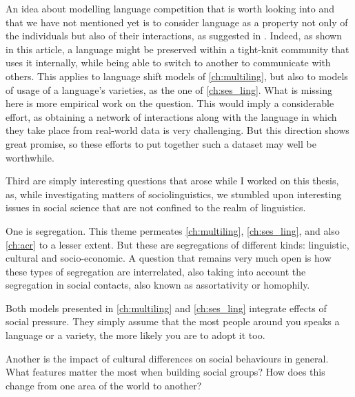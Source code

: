 \documentclass[../thesis.tex]{subfiles}
\begin{document}
An idea about modelling language competition that is worth looking into and that we have
not mentioned yet is to consider language as a property not only of the individuals but
also of their interactions, as suggested in \cite{CarroCoupledDynamics2016}. Indeed, as
shown in this article, a language might be preserved within a tight-knit community that
uses it internally, while being able to switch to another to communicate with others.
This applies to language shift models of \cref{ch:multiling}, but also to models of
usage of a language's varieties, as the one of \cref{ch:ses_ling}. What is missing here
is more empirical work on the question. This would imply a considerable effort, as
obtaining a network of interactions along with the language in which they take place
from real-world data is very challenging. But this direction shows great promise, so
these efforts to put together such a dataset may well be worthwhile.


Third are simply interesting questions that arose while I worked on this thesis, as, while investigating matters of sociolinguistics, we stumbled upon interesting
issues in social science that are not confined to the realm of linguistics.

One is segregation. This theme permeates \cref{ch:multiling},
\cref{ch:ses_ling}, and also \cref{ch:acr} to a lesser extent. But these are
segregations of different kinds: linguistic, cultural and socio-economic. A question
that remains very much open is how these types of segregation are interrelated, also
taking into account the segregation in social contacts, also known as assortativity or
homophily.

Both models presented in \cref{ch:multiling} and \cref{ch:ses_ling} integrate effects of social pressure. They simply assume that the most people around you speaks a language or a variety, the more likely you are to adopt it too.

Another is the impact of cultural differences on social behaviours in general. What
features matter the most when building social groups? How does this change from one area
of the world to another?
\end{document}
